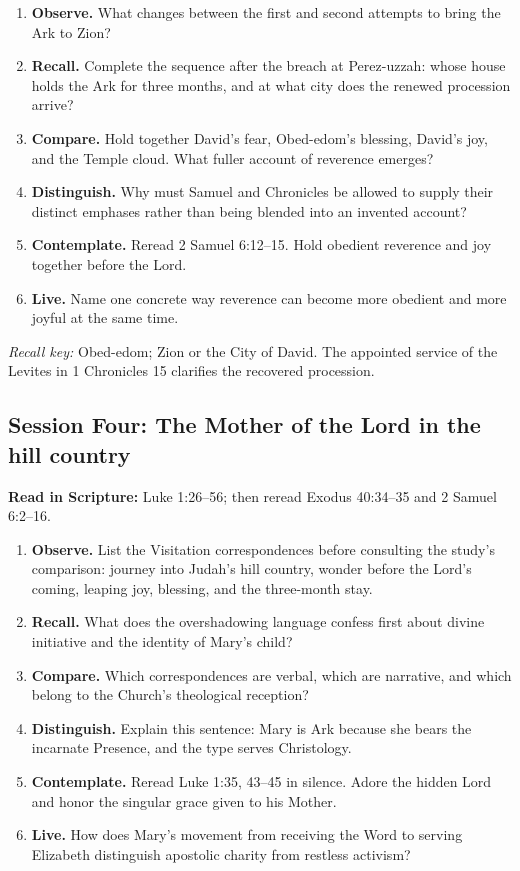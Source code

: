 \begin{enumerate}
  \item \textbf{Observe.} What changes between the first and second attempts
  to bring the Ark to Zion?
  \item \textbf{Recall.} Complete the sequence after the breach at
  Perez-uzzah: whose house holds the Ark for three months, and at what city
  does the renewed procession arrive?
  \item \textbf{Compare.} Hold together David's fear, Obed-edom's blessing,
  David's joy, and the Temple cloud.  What fuller account of reverence emerges?
  \item \textbf{Distinguish.} Why must Samuel and Chronicles be allowed to supply
  their distinct emphases rather than being blended into an invented account?
  \item \textbf{Contemplate.} Reread 2 Samuel 6:12--15.  Hold obedient
  reverence and joy together before the Lord.
  \item \textbf{Live.} Name one concrete way reverence can become more
  obedient and more joyful at the same time.
\end{enumerate}

\textit{Recall key:} Obed-edom; Zion or the City of David.  The appointed
service of the Levites in 1 Chronicles 15 clarifies the recovered procession.

\subsection{Session Four: The Mother of the Lord in the hill country}

\textbf{Read in Scripture:} Luke 1:26--56; then reread Exodus 40:34--35 and
2 Samuel 6:2--16.

\begin{enumerate}
  \item \textbf{Observe.} List the Visitation correspondences before consulting
  the study's comparison: journey into Judah's hill country, wonder before the
  Lord's coming, leaping joy, blessing, and the three-month stay.
  \item \textbf{Recall.} What does the overshadowing language confess first
  about divine initiative and the identity of Mary's child?
  \item \textbf{Compare.} Which correspondences are verbal, which are
  narrative, and which belong to the Church's theological reception?
  \item \textbf{Distinguish.} Explain this sentence: Mary is Ark because she bears
  the incarnate Presence, and the type serves Christology.
  \item \textbf{Contemplate.} Reread Luke 1:35, 43--45 in silence.  Adore the
  hidden Lord and honor the singular grace given to his Mother.
  \item \textbf{Live.} How does Mary's movement from receiving the Word to
  serving Elizabeth distinguish apostolic charity from restless activism?
\end{enumerate}

